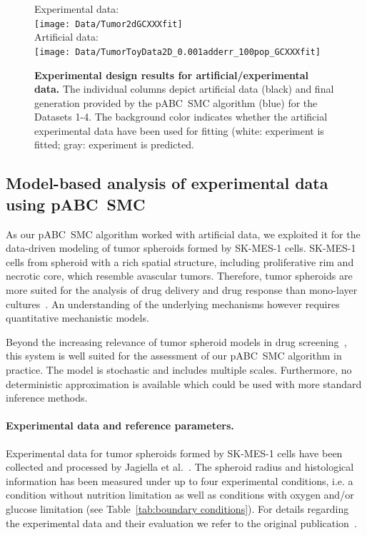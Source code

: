 \documentclass[10pt,letterpaper]{article}
\begin{document}
\begin{figure}[t]
\begin{adjustwidth}{-2in}{0in} %
\begin{center}
Experimental data:\\
\texttt{[image: Data/Tumor2dGCXXXfit]}\\
Artificial data:\\
\texttt{[image: Data/TumorToyData2D\_0.001adderr\_100pop\_GCXXXfit]}
\end{center}
\vspace*{0.5cm}
\caption{{\bf Experimental design results for artificial/experimental data.}
The individual columns depict artificial data (black) and final generation provided by the pABC~SMC algorithm (blue) for the Datasets 1-4. The background color indicates whether the artificial experimental data have been used for fitting (white: experiment is fitted; gray: experiment is predicted.}
\label{fig: experimental design using 2D model}
\end{adjustwidth}
\end{figure}

\subsection*{Model-based analysis of experimental data using pABC~SMC}
As our pABC~SMC algorithm worked with artificial data, we exploited it for the data-driven modeling of tumor spheroids formed by SK-MES-1 cells. SK-MES-1 cells from spheroid with a rich spatial structure, including proliferative rim and necrotic core, which resemble avascular tumors. Therefore, tumor spheroids are more suited for the analysis of drug delivery and drug response than mono-layer cultures~\cite{CarverMin2014,LemmoAte2014}. An understanding of the underlying mechanisms however requires quantitative mechanistic models. 

Beyond the increasing relevance of tumor spheroid models in drug screening~\cite{KwapiszewskaMic2014}, this system is well suited for the assessment of our pABC~SMC algorithm in practice. The model is stochastic and includes multiple scales. Furthermore, no deterministic approximation is available which could be used with more standard inference methods.

\paragraph*{Experimental data and reference parameters.}
Experimental data for tumor spheroids formed by SK-MES-1 cells have been collected and processed by Jagiella et al.~\cite{JagiellaMul2015}. The spheroid radius and histological information has been measured under up to four experimental conditions, i.e. a condition without nutrition limitation as well as conditions with oxygen and/or glucose limitation  (see Table~\ref{tab:boundary conditions}). For details regarding the experimental data and their evaluation we refer to the original publication~\cite{JagiellaMul2015}.
\end{document}
